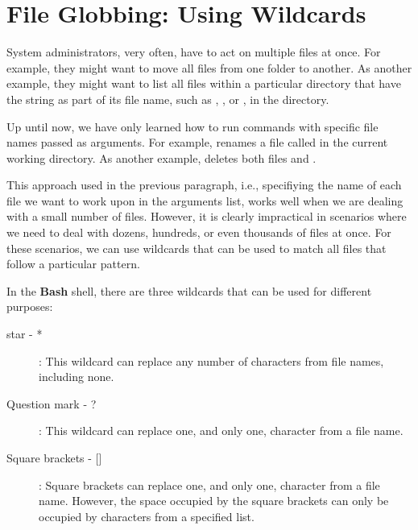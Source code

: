 \chapter{File Globbing: Using Wildcards}\label{ch:file_globbing}

System administrators, very often, have to act on multiple files at once. For example, they might want to move all  files from one folder to another. As another example, they might want to list all files within a particular directory that have the string  as part of its file name, such as , , or , in the  directory.

Up until now, we have only learned how to run commands with specific file names passed as arguments. For example,  renames a file called  in the current working directory. As another example,  deletes both files  and .

This approach used in the previous paragraph, i.e., specifiying the name of each file we want to work upon in the arguments list, works well when we are dealing with a small number of files. However, it is clearly impractical in scenarios where we need to deal with dozens, hundreds, or even thousands of files at once. For these scenarios, we can use wildcards that can be used to match all files that follow a particular pattern.

In the \textbf{Bash} shell, there are three wildcards that can be used for different purposes:

\begin{description}
\item[star - *]: This wildcard can replace any number of characters from file names, including none.
\item[Question mark - ?] : This wildcard can replace one, and only one, character from a file name.
\item[Square brackets - {[}{]}] : Square brackets can replace one, and only one, character from a file name. However, the space occupied by the square brackets can only be occupied by characters from a specified list.
\end{description}

